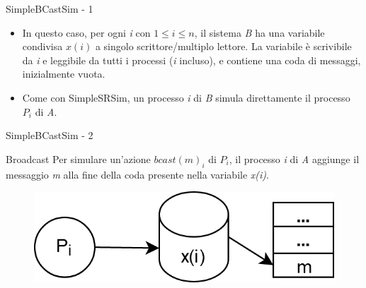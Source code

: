 \documentclass{beamer}
\begin{document}
    \begin{frame}{SimpleBCastSim - 1}
        \begin{itemize}[<+->]
            \item In questo caso, per ogni \textit{i} con $1 \leq i \leq n$, il sistema \textit{B} ha una variabile condivisa $x(i)$ a singolo scrittore/multiplo lettore.
            \newline La variabile è scrivibile da \textit{i} e leggibile da tutti i processi (\textit{i} incluso), e contiene una coda di messaggi, inizialmente vuota.
            \item Come con SimpleSRSim, un processo \textit{i} di \textit{B} simula direttamente il processo $P_{i}$ di \textit{A}.
        \end{itemize}
    \end{frame}

    \begin{frame}{SimpleBCastSim - 2}
        \begin{block}{Broadcast}
            Per simulare un'azione $bcast(m)_{i}$ di $P_{i}$, il processo \textit{i} di \textit{A} aggiunge il messaggio \textit{m} alla fine della coda presente nella variabile \textit{x(i)}.
            \begin{figure}
                \centering
                \includegraphics[scale=0.3]{Broadcast.png}
            \end{figure}
        \end{block}
    \end{frame}
\end{document}
